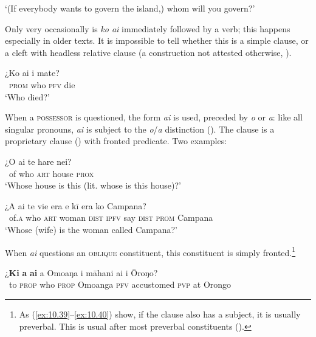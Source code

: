 \glt
‘(If everybody wants to govern the island,) whom will you govern?’ \textstyleExampleref{[R647.370]} 
\z

Only very occasionally is \textit{ko ai} immediately followed by a verb; this happens especially in older texts. It is impossible to tell whether this is a simple clause, or a cleft with headless relative clause (a construction not attested otherwise, ).

\ea\label{ex:10.36}
\gll ¿Ko ai i mate? \\
~\textsc{prom} who \textsc{pfv} die \\

\glt 
‘Who died?’ \textstyleExampleref{[MsE-046.009]}
\z

When a \textsc{possessor} is questioned, the form \textit{{\ꞌ}ai} is used, preceded by \textit{o} or \textit{{\ꞌ}a}: like all singular pronouns, \textit{{\ꞌ}ai} is subject to the \textit{o}/\textit{a} distinction (). The clause is a proprietary clause () with fronted predicate. Two examples:

\ea\label{ex:10.37}
\gll ¿O {\ꞌ}ai te hare nei? \\
~of who \textsc{art} house \textsc{prox} \\

\glt 
‘Whose house is this (lit. whose is this house)?’ \textstyleExampleref{[R208.194]} 
\z

\ea\label{ex:10.38}
\gll ¿{\ꞌ}A {\ꞌ}ai te vi{\ꞌ}e era e kī era ko Campana? \\
~of\textsc{.a} who \textsc{art} woman \textsc{dist} \textsc{ipfv} say \textsc{dist} \textsc{prom} Campana \\

\glt 
‘Whose (wife) is the woman called Campana?’ \textstyleExampleref{[R416.1164]}
\z

When \textit{ai} questions an \textsc{oblique} constituent, this constituent is simply fronted.\footnote{\label{fn:488}As (\ref{ex:10.39}–\ref{ex:10.40}) show, if the clause also has a subject, it is usually preverbal. This is usual after most preverbal constituents ().} 

\ea\label{ex:10.39}
\gll ¿\textbf{Ki} \textbf{a} \textbf{ai} a Omoaŋa i māhani ai {\ꞌ}i {\ꞌ}Ōroŋo? \\
~to \textsc{prop} who \textsc{prop} Omoanga \textsc{pfv} accustomed \textsc{pvp} at Orongo \\


